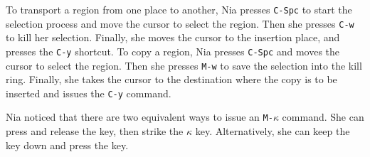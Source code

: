 \documentclass[a4paper,12pt]{book}
\begin{document}
To transport a region from one place to another,
Nia presses \verb|C-Spc| to start
 the selection process 
 and move the cursor to select the region. 
 Then she presses \verb|C-w| to
kill her selection. Finally, she moves
the cursor to the insertion place,
and presses the \verb|C-y| shortcut.
To copy a region, Nia presses \verb|C-Spc| and moves
the cursor to select the region.
Then she presses \verb|M-w| to save the selection
into the kill ring. Finally,
she takes the cursor to the destination where the
copy is to be inserted and
issues the \verb|C-y| command.

Nia noticed that there are two equivalent ways to
issue an \verb|M-|$\kappa$ command. She can
press and release the  key, then
strike the  $\kappa$ key. Alternatively, she
can keep the  key down and press
the \keys{$\kappa$} key.
\end{document}

